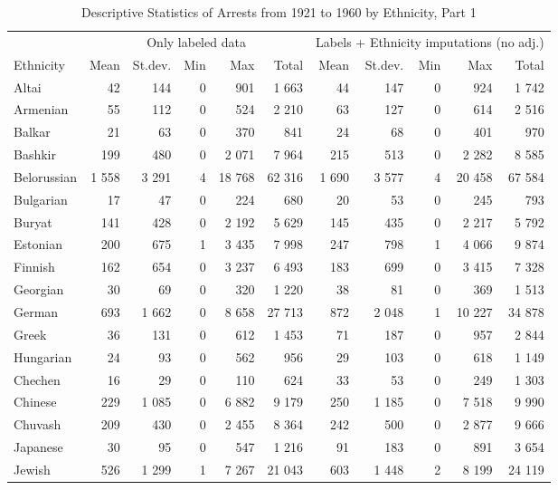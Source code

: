 \begin{table}[!h]

\caption{\label{tab:descr_stats_by_ethnicity}Descriptive Statistics of Arrests from 1921 to 1960 by Ethnicity, Part 1}
\centering
\fontsize{8}{10}\selectfont
\begin{tabular}{lrrrrrrrrrr}
\toprule
\multicolumn{1}{c}{ } & \multicolumn{5}{c}{Only labeled data} & \multicolumn{5}{c}{Labels + Ethnicity imputations (no adj.)} \\
\cmidrule(l{2pt}r{2pt}){2-6} \cmidrule(l{2pt}r{2pt}){7-11}
Ethnicity & Mean & St.dev. & Min & Max & Total & Mean & St.dev. & Min & Max & Total\\
\midrule
Altai & 42 & 144 & 0 & 901 & 1 663 & 44 & 147 & 0 & 924 & 1 742\\
Armenian & 55 & 112 & 0 & 524 & 2 210 & 63 & 127 & 0 & 614 & 2 516\\
Balkar & 21 & 63 & 0 & 370 & 841 & 24 & 68 & 0 & 401 & 970\\
Bashkir & 199 & 480 & 0 & 2 071 & 7 964 & 215 & 513 & 0 & 2 282 & 8 585\\
Belorussian & 1 558 & 3 291 & 4 & 18 768 & 62 316 & 1 690 & 3 577 & 4 & 20 458 & 67 584\\
Bulgarian & 17 & 47 & 0 & 224 & 680 & 20 & 53 & 0 & 245 & 793\\
Buryat & 141 & 428 & 0 & 2 192 & 5 629 & 145 & 435 & 0 & 2 217 & 5 792\\
Estonian & 200 & 675 & 1 & 3 435 & 7 998 & 247 & 798 & 1 & 4 066 & 9 874\\
Finnish & 162 & 654 & 0 & 3 237 & 6 493 & 183 & 699 & 0 & 3 415 & 7 328\\
Georgian & 30 & 69 & 0 & 320 & 1 220 & 38 & 81 & 0 & 369 & 1 513\\
German & 693 & 1 662 & 0 & 8 658 & 27 713 & 872 & 2 048 & 1 & 10 227 & 34 878\\
Greek & 36 & 131 & 0 & 612 & 1 453 & 71 & 187 & 0 & 957 & 2 844\\
Hungarian & 24 & 93 & 0 & 562 & 956 & 29 & 103 & 0 & 618 & 1 149\\
Chechen & 16 & 29 & 0 & 110 & 624 & 33 & 53 & 0 & 249 & 1 303\\
Chinese & 229 & 1 085 & 0 & 6 882 & 9 179 & 250 & 1 185 & 0 & 7 518 & 9 990\\
Chuvash & 209 & 430 & 0 & 2 455 & 8 364 & 242 & 500 & 0 & 2 877 & 9 666\\
Japanese & 30 & 95 & 0 & 547 & 1 216 & 91 & 183 & 0 & 891 & 3 654\\
Jewish & 526 & 1 299 & 1 & 7 267 & 21 043 & 603 & 1 448 & 2 & 8 199 & 24 119\\

\end{tabular}
\end{table}
